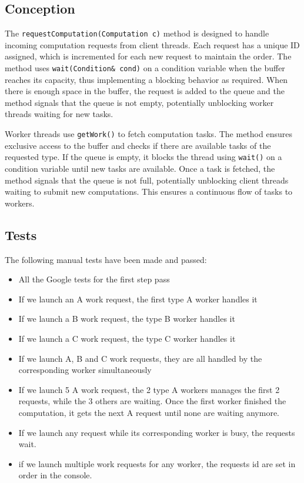 \documentclass{article}
\begin{document}
    \subsection*{Conception}


    The \texttt{requestComputation(Computation c)} method is designed to handle incoming computation requests from client threads.
    Each request has a unique ID assigned, which is incremented for each new request to maintain the order.
    The method uses \texttt{wait(Condition\& cond)} on a condition variable when the buffer reaches its capacity, thus implementing a blocking behavior as required.
    When there is enough space in the buffer, the request is added to the queue and the method signals that the queue is not empty, potentially unblocking worker threads waiting for new tasks.

    Worker threads use \texttt{getWork()} to fetch computation tasks.
    The method ensures exclusive access to the buffer and checks if there are available tasks of the requested type.
    If the queue is empty, it blocks the thread using \texttt{wait()} on a condition variable until new tasks are available.
    Once a task is fetched, the method signals that the queue is not full, potentially unblocking client threads waiting to submit new computations.
    This ensures a continuous flow of tasks to workers.

    \subsection*{Tests}

    The following manual tests have been made and passed:

    \begin{itemize}
        \item All the Google tests for the first step pass
        \item If we launch an A work request, the first type A worker handles it
        \item If we launch a B work request, the type B worker handles it
        \item If we launch a C work request, the type C worker handles it
        \item If we launch A, B and C work requests, they are all handled by the corresponding worker simultaneously
        \item If we launch 5 A work request, the 2 type A workers manages the first 2 requests, while the 3 others are waiting. Once the first worker finished the computation, it gets the next A request until none are waiting anymore.
        \item If we launch any request while its corresponding worker is busy, the requests wait.
        \item if we launch multiple work requests for any worker, the requests id are set in order in the console.
    \end{itemize}
\end{document}
